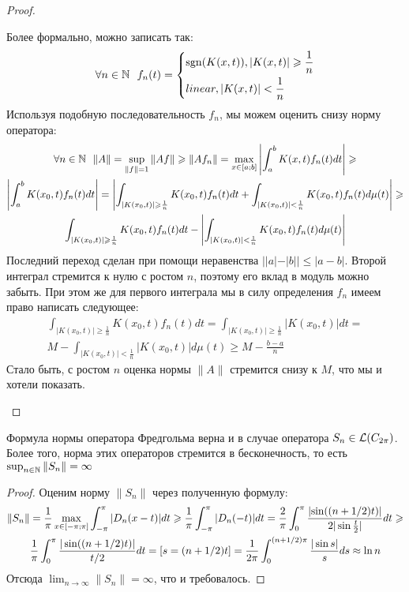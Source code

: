 \begin{proof}
\begin{itemize}
		Более формально, можно записать так:
		\[
			\forall n \in \mathbb{N}\ \ f_n(t) = \left\{ \begin{aligned} 
				&{\operatorname{sgn}(K(x, t)), |K(x, t)| \geqslant \frac{1}{n}}
				\\
				&{linear, |K(x, t)| < \frac{1}{n}}
			 \end{aligned} \right.
		\]
		Используя подобную последовательность $f_n$, мы можем оценить снизу норму оператора:
		\begin{multline*}
			\forall n \in \mathbb{N}\ \ \|A\| = \sup_{\|f\| = 1} \|Af\| \geqslant \|Af_n\| = \max_{x \in [a; b]} \left|\int_a^b K(x, t)f_n(t)dt\right| \geqslant
			\\
			\left|\int_a^b K(x_0, t)f_n(t)dt\right| = \left|\int_{|K(x_0, t)| \geqslant \frac{1}{n}} K(x_0, t)f_n(t)dt + \int_{|K(x_0, t)| < \frac{1}{n}} K(x_0, t)f_n(t)d\mu(t)\right| \geqslant
			\\
			\int_{|K(x_0, t)| \geqslant \frac{1}{n}} K(x_0, t)f_n(t)dt - \left|\int_{|K(x_0, t)| < \frac{1}{n}} K(x_0, t)f_n(t)d\mu(t)\right|
		\end{multline*}
		Последний переход сделан при помощи неравенства $||a| - |b|| \le |a - b|$. Второй интеграл стремится к нулю с ростом $n$, поэтому его вклад в модуль можно забыть. При этом же для первого интеграла мы в силу определения $f_n$ имеем право написать следующее:
		\begin{multline*}
			\int_{|K(x_0, t)| \ge \frac{1}{n}} K(x_0, t)f_n(t)dt = \int_{|K(x_0, t)| \ge \frac{1}{n}} |K(x_0, t)|dt =
			\\
			M - \int_{|K(x_0, t)| < \frac{1}{n}} |K(x_0, t)|d\mu(t) \ge M - \frac{b - a}{n}
		\end{multline*}
		Стало быть, с ростом $n$ оценка нормы $\|A\|$ стремится снизу к $M$, что мы и хотели показать.
	\end{itemize}
\end{proof}

\begin{corollary}
	Формула нормы оператора Фредгольма верна и в случае оператора $S_n \in \mathcal{L}(C_{2\pi})$. Более того, норма этих операторов стремится в бесконечность, то есть $\sup_{n \in \mathbb{N}} \|S_n\| = \infty$
\end{corollary}

\begin{proof}
	Оценим норму $\|S_n\|$ через полученную формулу:
	\begin{multline*}
		\|S_n\| = \frac{1}{\pi} \max_{x \in [-\pi; \pi]} \int_{-\pi}^\pi |D_n(x - t)|dt \geqslant \frac{1}{\pi} \int_{-\pi}^\pi |D_n(-t)|dt = \frac{2}{\pi} \int_0^\pi \frac{\left|\sin((n + 1 / 2)t)\right|}{2|\sin \frac{t}{2}|}dt \geqslant
		\\
		\frac{1}{\pi} \int_0^\pi \frac{|\sin((n + 1 / 2)t)|}{t / 2}dt = [s = (n + 1 / 2)t] = \frac{1}{2\pi} \int_0^{(n + 1 / 2)\pi} \frac{|\sin s|}{s}ds \approx \ln n
	\end{multline*}
	Отсюда $\lim_{n \to \infty} \|S_n\| = \infty$, что и требовалось.
\end{proof}